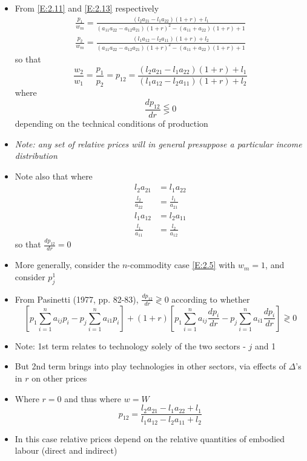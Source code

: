 \documentclass[a4paper,twoside]{article}
\numberwithin{equation}{section}
\numberwithin{figure}{section}
\begin{document}
\begin{itemize}
\begin{figure}[H]
		\end{figure}
		\item From \cref{E:2.11} and \cref{E:2.13} respectively
		\begin{gather*}
			\frac{p_1}{w_m} = \frac{(l_2 a_{21} - l_1 a_{22}) (1+r) + l_1}{(a_{11} a_{22} - a_{12} a_{21}) (1+r)^2 - (a_{11} + a_{22}) (1 + r) + 1} \\
			\frac{p_2}{w_m} = \frac{(l_1 a_{12} - l_2 a_{11}) (1+r) + l_2}{(a_{11} a_{22} - a_{12} a_{21}) (1+r)^2 - (a_{11} + a_{22}) (1 + r) + 1} 
		\end{gather*}
		so that
		\begin{equation}
			\frac{w_2}{w_1} = \frac{p_1}{p_2} = p_{12} = \frac{(l_2 a_{21} - l_1 a_{22}) (1 + r) + l_1}{(l_1 a_{12} - l_2 a_{11}) (1 + r) + l_2} \label{E:2.16}
		\end{equation}
		where
		\begin{equation}
			\frac{dp_{12}}{dr} \lesseqgtr 0 \label{E:2.17}
		\end{equation}
		depending on the technical conditions of production 
		\item \textit{Note: any set of relative prices will in general  presuppose a particular income distribution}
		\item  Note also that where
		\begin{align*}
			l_2 a_{21} &= l_1 a_{22}\\
			\frac{l_2}{a_{22}} & = \frac{l_1}{a_{21}}\\
			l_1 a_{12} &= l_2 a_{11}\\
			\frac{l_1}{a_{11}} & = \frac{l_2}{a_{12}}
		\end{align*}
		so that \( \frac{dp_{12}}{dr} = 0 \)
		\item More generally, consider the \( n \)-commodity case \cref{E:2.5} with \( w_m = 1 \), and consider \( p_j^1 \)
		\item From Pasinetti (1977, pp. 82-83), \( \frac{dp_{12}}{dr} \gtrless 0 \)  according to whether 
		\[
			\left[ p_1 \sum_{i = 1}^{n} a_{ij} p_i - p_j \sum_{i = 1}^{n} a_{i1} p_i \right] + (1+r) \left[ p_1 \sum_{i = 1}^{n} a_{ij} \frac{dp_i}{dr} - p_j \sum_{i = 1}^{n} a_{i1} \frac{dp_i}{dr} \right] \gtrless 0
		\]
		\item Note: 1st term relates to technology solely of the two sectors - \( j \) and 1
		\item But 2nd term brings into play technologies in other sectors, via effects of \( \Delta \)'s in \( r \) on other prices
		\item Where \( r = 0 \) and thus where \( w = W \)
		\begin{equation}
			p_{12} = \frac{l_2 a_{21} - l_1 a_{22} + l_1}{l_1 a_{12} - l_2 a_{11} + l_2} \label{E:2.18}
		\end{equation}
		\item  In this case relative prices depend on the relative quantities of embodied labour (direct and indirect)
	\end{itemize}
\end{document}
